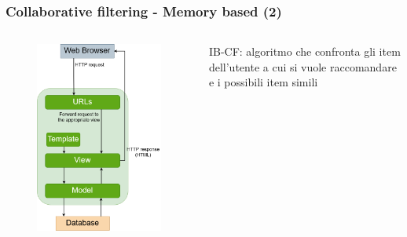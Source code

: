 \begin{frame}
    \frametitle{Collaborative filtering - Memory based (2)}
    \begin{columns}
        \begin{column}{0.5\textwidth}
            \begin{figure}
                \centering
                \includegraphics[scale=0.5]{images/IB_CF_ex}
            \end{figure}
        \end{column}
        \begin{column}{0.5\textwidth}
            \alert{IB-CF}: algoritmo che confronta gli item dell'utente a cui si vuole raccomandare e i possibili item simili
        \end{column}
    \end{columns}
\end{frame}

